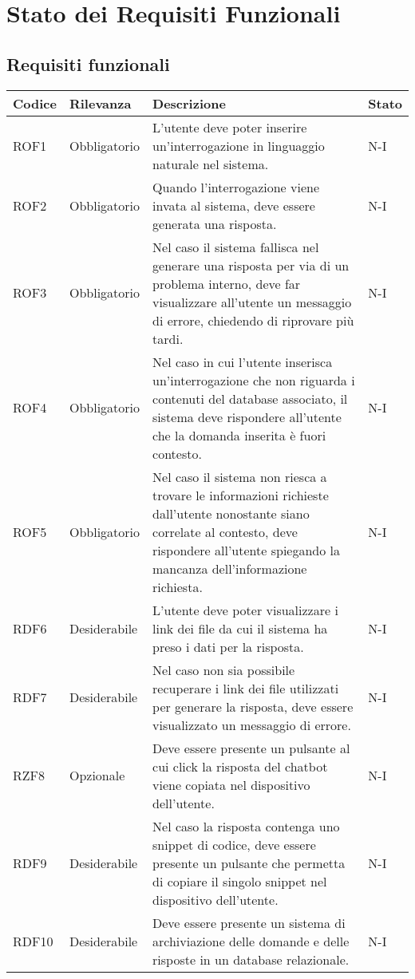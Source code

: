 
\section{Stato dei Requisiti Funzionali}
\label{sec:stato_requisiti_funzionali}


\subsection{Requisiti funzionali}
\label{sec:requisiti_funzionali}

\begin{table}[h!]
    \centering
    \renewcommand{\arraystretch}{1.6} %
    \begin{tabularx}{\textwidth}{|p{2cm}|p{3cm}|X|p{4cm}|} \hline
    \rowcolor[HTML]{FFD700} 
    \textbf{Codice} & \textbf{Rilevanza} & \textbf{Descrizione} & \textbf{Stato} \\ \hline
    ROF1 & Obbligatorio & L’utente deve poter inserire un’interrogazione in linguaggio naturale nel sistema. & N-I \\ \hline
    ROF2 & Obbligatorio & Quando l'interrogazione viene invata al sistema, deve essere generata una risposta. & N-I \\ \hline
    ROF3 & Obbligatorio & Nel caso il sistema fallisca nel generare una risposta per via di un problema interno, deve far visualizzare all'utente un messaggio di errore, chiedendo di riprovare più tardi. & N-I \\ \hline
    ROF4 & Obbligatorio & Nel caso in cui l'utente inserisca un'interrogazione che non riguarda i contenuti del database associato, il sistema deve rispondere all'utente che la domanda inserita è fuori contesto. & N-I \\ \hline
    ROF5 & Obbligatorio & Nel caso il sistema non riesca a trovare le informazioni richieste dall'utente nonostante siano correlate al contesto, deve rispondere all'utente spiegando la mancanza dell'informazione richiesta. & N-I \\ \hline
    RDF6 & Desiderabile & L'utente deve poter visualizzare i link dei file da cui il sistema ha preso i dati per la risposta. & N-I \\ \hline
    RDF7 & Desiderabile & Nel caso non sia possibile recuperare i link dei file utilizzati per generare la risposta, deve essere visualizzato un messaggio di errore. & N-I \\ \hline
    RZF8 & Opzionale & Deve essere presente un pulsante al cui click la risposta del chatbot viene copiata nel dispositivo dell'utente. & N-I \\ \hline
    RDF9 & Desiderabile & Nel caso la risposta contenga uno snippet di codice, deve essere presente un pulsante che permetta di copiare il singolo snippet nel dispositivo dell'utente. & N-I \\ \hline
    RDF10 & Desiderabile & Deve essere presente un sistema di archiviazione delle domande e delle risposte in un database relazionale. & N-I \\ \hline


\end{tabularx}
\end{table}
